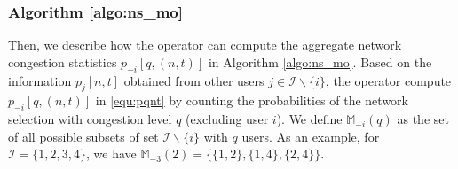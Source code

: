 \documentclass[journal]{IEEEtran}
\newcommand{\mc}[1]{\mathcal{#1}}
\newcommand{\bs}[1]{\boldsymbol{#1}}
\begin{document}



\subsubsection{Algorithm \ref{algo:ns_mo}}	\label{sec:algomo}
	
	Then, we describe how the operator can compute the aggregate network congestion statistics $p_{-i}[q,(n,t)]$ in Algorithm \ref{algo:ns_mo}.
	Based on the information $p_j[n,t]$ obtained from other users $j \in \mc{I} \backslash \{i\}$, the operator compute $p_{-i}[q,(n,t)]$ in \eqref{equ:pqnt} by counting the probabilities of the network selection with congestion level $q$ (excluding user $i$). We define $\mathbb{M}_{-i}(q)$ as the set of all possible subsets of set $\mc{I} \backslash \{i\}$ with $q$ users. As an example, for $\mc{I} = \{1,2,3,4\}$, we have $\mathbb{M}_{-3}(2) = \bigl\{ \{1,2\}, \{1,4\}, \{2,4\} \bigr\}$.
\end{document}

